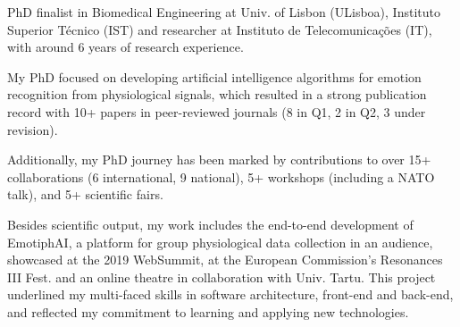 

\begin{cvparagraph}

PhD finalist in Biomedical Engineering at Univ. of Lisbon (ULisboa), Instituto Superior Técnico (IST) and researcher at Instituto de Telecomunicações (IT), with around 6 years of research experience.

My PhD focused on developing artificial intelligence algorithms for emotion recognition from physiological signals, which resulted in a strong publication record with 10+ papers in peer-reviewed journals (8 in Q1, 2 in Q2, 3 under revision). 

Additionally, my PhD journey has been marked by contributions to over 15+ collaborations (6 international, 9 national), 5+ workshops (including a NATO talk), and 5+ scientific fairs.

Besides scientific output, my work includes the end-to-end development of EmotiphAI, a platform for group physiological data collection in an audience, showcased at the 2019 WebSummit, at the European Commission's Resonances III Fest. and an online theatre in collaboration with Univ. Tartu. This project underlined my multi-faced skills in software architecture, front-end and back-end, and reflected my commitment to learning and applying new technologies.
\end{cvparagraph}
